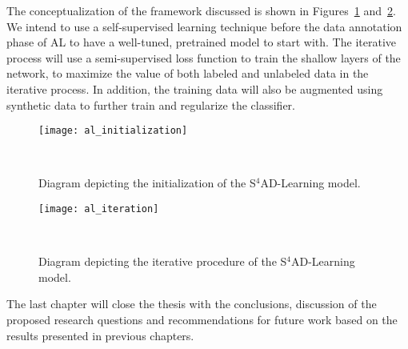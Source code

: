 The conceptualization of the framework discussed is shown in
Figures~\ref{fig:al_initialization2} and~\ref{fig:al_iteration2}. We intend to
use a self-supervised learning technique before the data annotation phase of
AL to have a well-tuned, pretrained model to start with. The iterative process
will use a semi-supervised loss function to train the shallow layers of the
network, to maximize the value of both labeled and unlabeled data in the
iterative process. In addition, the training data will also be augmented
using synthetic data to further train and regularize the classifier.

\begin{figure}
	\centering
	\texttt{[image: al\_initialization]}
    \caption{%
        Diagram depicting the initialization of the S$^4$AD-Learning model.
    }~\label{fig:al_initialization2}
\end{figure}


\begin{figure}
	\centering
	\texttt{[image: al\_iteration]}
    \caption{%
        Diagram depicting the iterative procedure of the S$^4$AD-Learning model.
    }~\label{fig:al_iteration2}
\end{figure}

The last chapter will close the thesis with the conclusions, discussion of the
proposed research questions and recommendations for future work based on the
results presented in previous chapters.
